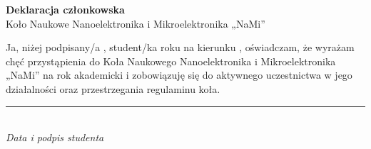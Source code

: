 \documentclass[12pt,a4paper]{article}
\begin{document}
\begin{center}
    {\LARGE \textbf{Deklaracja członkowska}}\\[0.5cm]
    {\large Koło Naukowe Nanoelektronika i Mikroelektronika „NaMi”}\\[1cm]
\end{center}

Ja, niżej podpisany/a \underline{\hspace{10cm}}, student/ka \underline{\hspace{10cm}} roku \underline{\hspace{3cm}} na kierunku \underline{\hspace{10cm}}, 
oświadczam, że wyrażam chęć przystąpienia do Koła Naukowego Nanoelektronika i Mikroelektronika „NaMi” na rok akademicki \underline{\hspace{5cm}} i zobowiązuję się do aktywnego uczestnictwa w jego działalności oraz przestrzegania regulaminu koła.  

\vspace{1cm}

\begin{flushright}
    \noindent\rule{5cm}{0.4pt}\\

    \textit{Data i podpis studenta} \hspace{0.3cm}

\end{flushright}
\end{document}
